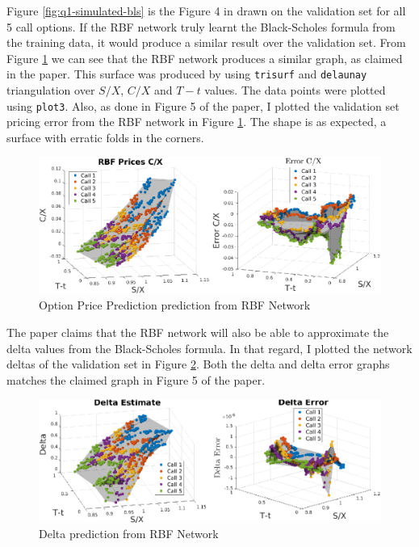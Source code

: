 \documentclass[11pt, fleqn]{article}
\begin{document}
Figure \ref{fig:q1-simulated-bls} is the Figure 4 in \cite{hutchinson} drawn on the validation set for all 5 call options. If the RBF network truly learnt the Black-Scholes formula from the training data, it would produce a similar result over the validation set. From Figure \ref{fig:q1-rbf-price} we can see that the RBF network produces a similar graph, as claimed in the paper. This surface was produced by using \texttt{trisurf} and \texttt{delaunay} triangulation over $S/X$, $C/X$ and $T-t$ values. The data points were plotted using \texttt{plot3}. Also, as done in Figure 5 of the paper, I plotted the validation set pricing error from the RBF network in Figure \ref{fig:q1-rbf-price}. The shape is as expected, a surface with erratic folds in the corners.\\

\begin{figure}[!h]
\begin{center}
	\includegraphics[scale=.6] {q1_rbf_price.eps}
	\caption{Option Price Prediction prediction from RBF Network}
	\label{fig:q1-rbf-price}
\end{center}
\end{figure}

The paper claims that the RBF network will also be able to approximate the delta values from the Black-Scholes formula. In that regard, I plotted the network deltas of the validation set in Figure \ref{fig:q1-rbf-delta}. Both the delta and delta error graphs matches the claimed graph in Figure 5 of the paper.\\

\begin{figure}[!h]
\begin{center}
	\includegraphics[scale=.6] {q1_rbf_delta.eps}
	\caption{Delta prediction from RBF Network}
	\label{fig:q1-rbf-delta}
\end{center}
\end{figure}
\end{document}
